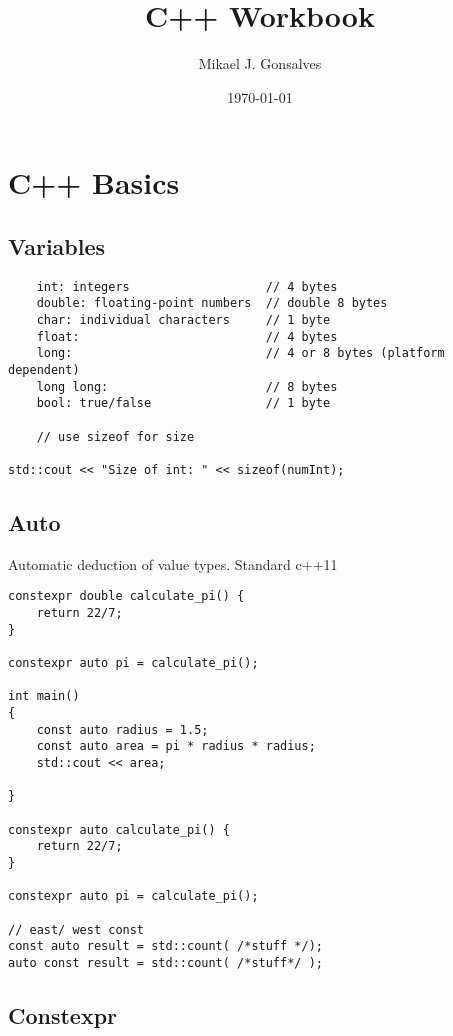 \documentclass[openany]{report}
\title{C++ Workbook}
\author{Mikael J. Gonsalves}
\date{\today}
\begin{document}
\maketitle
\tableofcontents

\chapter{C++ Basics}

\section{Variables}

\begin{verbatim}
    int: integers                   // 4 bytes
    double: floating-point numbers  // double 8 bytes
    char: individual characters     // 1 byte
    float:                          // 4 bytes
    long:                           // 4 or 8 bytes (platform dependent)
    long long:                      // 8 bytes
    bool: true/false                // 1 byte

    // use sizeof for size

std::cout << "Size of int: " << sizeof(numInt); 
\end{verbatim}

\section{Auto}

Automatic deduction of value types. Standard c++11

\begin{verbatim}
constexpr double calculate_pi() {
    return 22/7;
}

constexpr auto pi = calculate_pi();

int main()
{
    const auto radius = 1.5;
    const auto area = pi * radius * radius;
    std::cout << area;

}

constexpr auto calculate_pi() {
    return 22/7;
}

constexpr auto pi = calculate_pi();

// east/ west const
const auto result = std::count( /*stuff */);
auto const result = std::count( /*stuff*/ );
\end{verbatim}


\section{Constexpr}
\end{document}
